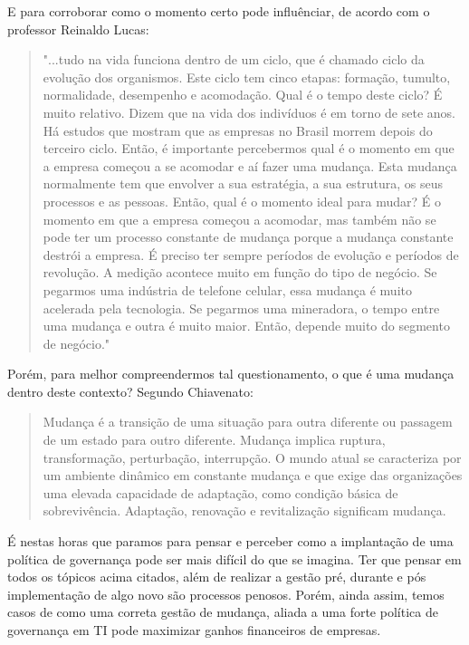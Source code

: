 E para corroborar como o momento certo pode influênciar, de acordo com o professor Reinaldo Lucas:
\begin{quotation}
"...tudo na vida funciona dentro de um ciclo, que é chamado ciclo da evolução dos organismos. Este ciclo tem cinco etapas: formação, tumulto, normalidade, desempenho e acomodação. Qual é o tempo deste ciclo? É muito relativo. Dizem que na vida dos indivíduos é em torno de sete anos. Há estudos que mostram que as empresas no Brasil morrem depois do terceiro ciclo. Então, é importante percebermos qual é o momento em que a empresa começou a se acomodar e aí fazer uma mudança. Esta mudança normalmente tem que envolver a sua estratégia, a sua estrutura, os seus processos e as pessoas. Então, qual é o momento ideal para mudar? É o momento em que a empresa começou a acomodar, mas também não se pode ter um processo constante de mudança porque a mudança constante destrói a empresa. É preciso ter sempre períodos de evolução e períodos de revolução. A medição acontece muito em função do tipo de negócio. Se pegarmos uma indústria de telefone celular, essa mudança é muito acelerada pela tecnologia. Se pegarmos uma mineradora, o tempo entre uma mudança e outra é muito maior. Então, depende muito do segmento de negócio."\cite{FDC}
\end{quotation}

Porém, para melhor compreendermos tal questionamento, o que é uma mudança dentro deste contexto? Segundo Chiavenato:

\begin{quotation}
Mudança é a transição de uma situação para outra diferente ou passagem de um estado
para outro diferente. Mudança implica ruptura, transformação, perturbação,
interrupção. O mundo atual se caracteriza por um ambiente dinâmico em constante
mudança e que exige das organizações uma elevada capacidade de adaptação, como
condição básica de sobrevivência. Adaptação, renovação e revitalização significam
mudança.\cite{CHIAVENATO}
\end{quotation}

É nestas horas que paramos para pensar e perceber como a implantação de uma política de governança pode ser mais difícil do que se imagina. Ter que pensar em todos os tópicos acima citados, além de realizar a gestão pré, durante e pós implementação de algo novo são processos penosos. Porém, ainda assim, temos casos de como uma correta gestão de mudança, aliada a uma forte política de governança em TI pode maximizar ganhos financeiros de empresas.

